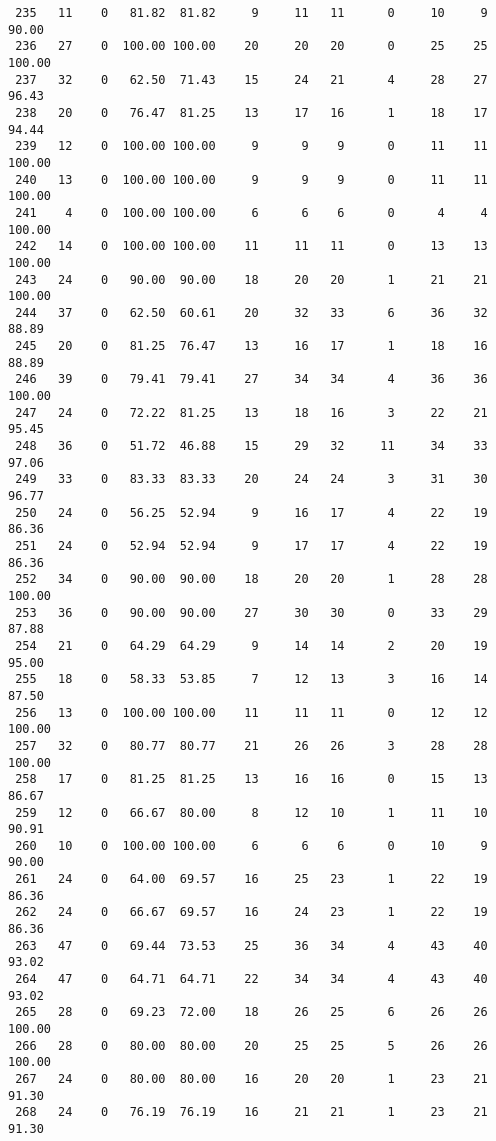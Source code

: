 \begin{verbatim}
 235   11    0   81.82  81.82     9     11   11      0     10     9    90.00
 236   27    0  100.00 100.00    20     20   20      0     25    25   100.00
 237   32    0   62.50  71.43    15     24   21      4     28    27    96.43
 238   20    0   76.47  81.25    13     17   16      1     18    17    94.44
 239   12    0  100.00 100.00     9      9    9      0     11    11   100.00
 240   13    0  100.00 100.00     9      9    9      0     11    11   100.00
 241    4    0  100.00 100.00     6      6    6      0      4     4   100.00
 242   14    0  100.00 100.00    11     11   11      0     13    13   100.00
 243   24    0   90.00  90.00    18     20   20      1     21    21   100.00
 244   37    0   62.50  60.61    20     32   33      6     36    32    88.89
 245   20    0   81.25  76.47    13     16   17      1     18    16    88.89
 246   39    0   79.41  79.41    27     34   34      4     36    36   100.00
 247   24    0   72.22  81.25    13     18   16      3     22    21    95.45
 248   36    0   51.72  46.88    15     29   32     11     34    33    97.06
 249   33    0   83.33  83.33    20     24   24      3     31    30    96.77
 250   24    0   56.25  52.94     9     16   17      4     22    19    86.36
 251   24    0   52.94  52.94     9     17   17      4     22    19    86.36
 252   34    0   90.00  90.00    18     20   20      1     28    28   100.00
 253   36    0   90.00  90.00    27     30   30      0     33    29    87.88
 254   21    0   64.29  64.29     9     14   14      2     20    19    95.00
 255   18    0   58.33  53.85     7     12   13      3     16    14    87.50
 256   13    0  100.00 100.00    11     11   11      0     12    12   100.00
 257   32    0   80.77  80.77    21     26   26      3     28    28   100.00
 258   17    0   81.25  81.25    13     16   16      0     15    13    86.67
 259   12    0   66.67  80.00     8     12   10      1     11    10    90.91
 260   10    0  100.00 100.00     6      6    6      0     10     9    90.00
 261   24    0   64.00  69.57    16     25   23      1     22    19    86.36
 262   24    0   66.67  69.57    16     24   23      1     22    19    86.36
 263   47    0   69.44  73.53    25     36   34      4     43    40    93.02
 264   47    0   64.71  64.71    22     34   34      4     43    40    93.02
 265   28    0   69.23  72.00    18     26   25      6     26    26   100.00
 266   28    0   80.00  80.00    20     25   25      5     26    26   100.00
 267   24    0   80.00  80.00    16     20   20      1     23    21    91.30
 268   24    0   76.19  76.19    16     21   21      1     23    21    91.30

\end{verbatim}
